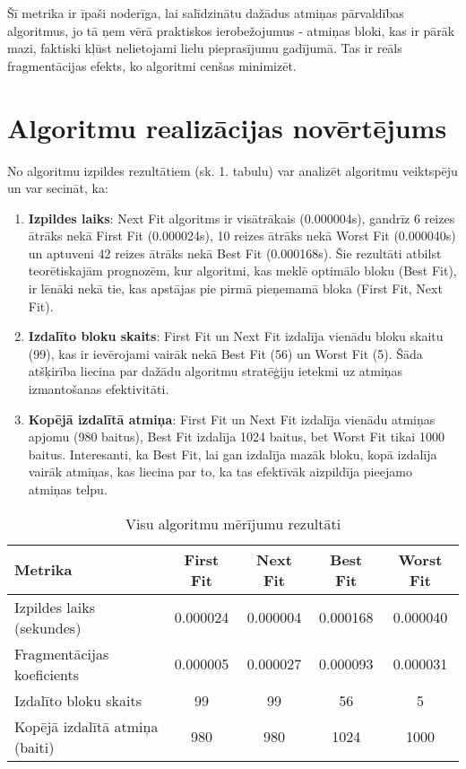 \documentclass{report}
\begin{document}
	Šī metrika ir īpaši noderīga, lai salīdzinātu dažādus atmiņas pārvaldības algoritmus, jo tā ņem vērā praktiskos ierobežojumus - atmiņas bloki, kas ir pārāk mazi, faktiski kļūst nelietojami lielu pieprasījumu gadījumā. Tas ir reāls fragmentācijas efekts, ko algoritmi cenšas minimizēt.
	
	\section{Algoritmu realizācijas novērtējums}
	
	No algoritmu izpildes rezultātiem (sk. 1. tabulu) var analizēt algoritmu veiktspēju un var secināt, ka:
	
	\begin{enumerate}
		\item \textbf{Izpildes laiks}: Next Fit algoritms ir visātrākais (0.000004s), gandrīz 6 reizes ātrāks nekā First Fit (0.000024s), 10 reizes ātrāks nekā Worst Fit (0.000040s) un aptuveni 42 reizes ātrāks nekā Best Fit (0.000168s). Šie rezultāti atbilst teorētiskajām prognozēm, kur algoritmi, kas meklē optimālo bloku (Best Fit), ir lēnāki nekā tie, kas apstājas pie pirmā pieņemamā bloka (First Fit, Next Fit).
		
		\item \textbf{Izdalīto bloku skaits}: First Fit un Next Fit izdalīja vienādu bloku skaitu (99), kas ir ievērojami vairāk nekā Best Fit (56) un Worst Fit (5). Šāda atšķirība liecina par dažādu algoritmu stratēģiju ietekmi uz atmiņas izmantošanas efektivitāti.
		
		\item \textbf{Kopējā izdalītā atmiņa}: First Fit un Next Fit izdalīja vienādu atmiņas apjomu (980 baitus), Best Fit izdalīja 1024 baitus, bet Worst Fit tikai 1000 baitus. Interesanti, ka Best Fit, lai gan izdalīja mazāk bloku, kopā izdalīja vairāk atmiņas, kas liecina par to, ka tas efektīvāk aizpildīja pieejamo atmiņas telpu.
	\end{enumerate}
	
	\begin{table}[h]
		\centering
		\begin{tabular}{lcccc}
			\toprule
			\textbf{Metrika} & \textbf{First Fit} & \textbf{Next Fit} & \textbf{Best Fit} & \textbf{Worst Fit} \\
			\midrule
			Izpildes laiks (sekundes) & 0.000024 & 0.000004 & 0.000168 & 0.000040 \\
			Fragmentācijas koeficients & 0.000005 & 0.000027 & 0.000093 & 0.000031 \\
			Izdalīto bloku skaits & 99 & 99 & 56 & 5 \\
			Kopējā izdalītā atmiņa (baiti) & 980 & 980 & 1024 & 1000 \\
			\bottomrule
		\end{tabular}
		\caption{Visu algoritmu mērījumu rezultāti}
		\label{tab:performance}
	\end{table}
	
\end{document}
